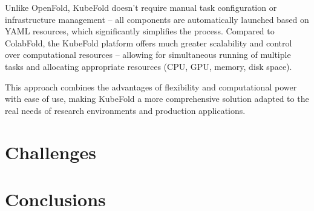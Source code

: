 Unlike OpenFold, KubeFold doesn't require manual task configuration or infrastructure management – all components are automatically launched based on YAML resources, which significantly simplifies the process.
Compared to ColabFold, the KubeFold platform offers much greater scalability and control over computational resources – allowing for simultaneous running of multiple tasks and allocating appropriate resources (CPU, GPU, memory, disk space).

This approach combines the advantages of flexibility and computational power with ease of use, making KubeFold a more comprehensive solution adapted to the real needs of research environments and production applications.

\begin{table}[H]
    \centering
    \caption{Comparison of computational infrastructure solutions: OpenFold, ColabFold, and KubeFold}
\end{table}

\section{Challenges}


\section{Conclusions}